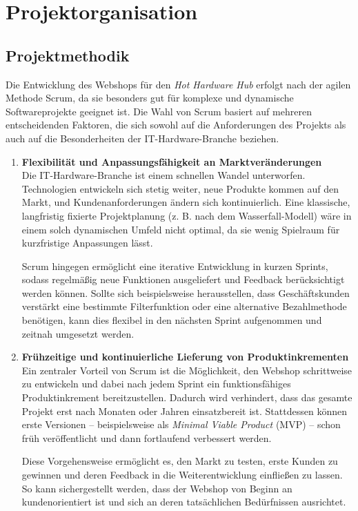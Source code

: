 \documentclass[%
	12pt,
	a4paper,
	oneside,
	parskip=full
]{scrbook}
\begin{document}
\chapter{Projektorganisation}
\section{Projektmethodik}
Die Entwicklung des Webshops für den \textit{Hot Hardware Hub} erfolgt nach der agilen Methode Scrum, da sie besonders gut für komplexe und dynamische Softwareprojekte geeignet ist. 
Die Wahl von Scrum basiert auf mehreren entscheidenden Faktoren, die sich sowohl auf die Anforderungen des Projekts als auch auf die Besonderheiten der IT-Hardware-Branche beziehen.

\begin{enumerate}
	\item \textbf{Flexibilität und Anpassungsfähigkeit an Marktveränderungen} \\
	Die IT-Hardware-Branche ist einem schnellen Wandel unterworfen. Technologien entwickeln sich stetig weiter, neue Produkte kommen auf den Markt, und Kundenanforderungen ändern sich kontinuierlich. Eine klassische, langfristig fixierte Projektplanung (z. B. nach dem Wasserfall-Modell) wäre in einem solch dynamischen Umfeld nicht optimal, da sie wenig Spielraum für kurzfristige Anpassungen lässt.
	
	Scrum hingegen ermöglicht eine iterative Entwicklung in kurzen Sprints, sodass regelmäßig neue Funktionen ausgeliefert und Feedback berücksichtigt werden können. Sollte sich beispielsweise herausstellen, dass Geschäftskunden verstärkt eine bestimmte Filterfunktion oder eine alternative Bezahlmethode benötigen, kann dies flexibel in den nächsten Sprint aufgenommen und zeitnah umgesetzt werden.
	
	\item \textbf{Frühzeitige und kontinuierliche Lieferung von Produktinkrementen} \\
	Ein zentraler Vorteil von Scrum ist die Möglichkeit, den Webshop schrittweise zu entwickeln und dabei nach jedem Sprint ein funktionsfähiges Produktinkrement bereitzustellen. Dadurch wird verhindert, dass das gesamte Projekt erst nach Monaten oder Jahren einsatzbereit ist. Stattdessen können erste Versionen – beispielsweise als \textit{Minimal Viable Product} (MVP) – schon früh veröffentlicht und dann fortlaufend verbessert werden.
	
	Diese Vorgehensweise ermöglicht es, den Markt zu testen, erste Kunden zu gewinnen und deren Feedback in die Weiterentwicklung einfließen zu lassen. So kann sichergestellt werden, dass der Webshop von Beginn an kundenorientiert ist und sich an deren tatsächlichen Bedürfnissen ausrichtet.
	

\end{enumerate}
\end{document}
